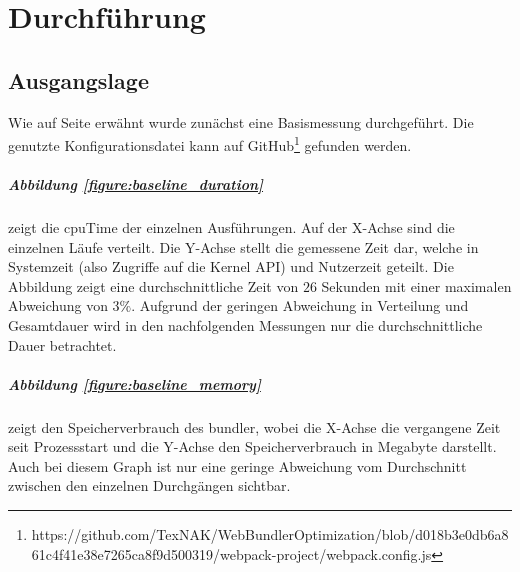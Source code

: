 \documentclass[11pt]{report}
\begin{document}
	\clearpage

	\chapter{Durchführung}
		\section{Ausgangslage}
			Wie auf Seite \pageref{baseline-build} erwähnt wurde zunächst eine Basismessung durchgeführt. Die genutzte Konfigurationsdatei kann auf GitHub\footnote{https://github.com/TexNAK/WebBundlerOptimization/blob/d018b3e0db6a861c4f41e38e7265ca8f9d500319/webpack-project/webpack.config.js} gefunden werden.
			\paragraph{Abbildung \ref{figure:baseline_duration}} zeigt die \Gls{cpuTime} der einzelnen Ausführungen. Auf der X-Achse sind die einzelnen Läufe verteilt. Die Y-Achse stellt die gemessene Zeit dar, welche in Systemzeit (also Zugriffe auf die Kernel API) und Nutzerzeit geteilt. Die Abbildung zeigt eine durchschnittliche Zeit von $26$ Sekunden mit einer maximalen Abweichung von $3\%$. Aufgrund der geringen Abweichung in Verteilung und Gesamtdauer wird in den nachfolgenden Messungen nur die durchschnittliche Dauer betrachtet.
			\paragraph{Abbildung \ref{figure:baseline_memory}} zeigt den Speicherverbrauch des \Gls{bundler}, wobei die X-Achse die vergangene Zeit seit Prozessstart und die Y-Achse den Speicherverbrauch in Megabyte darstellt. Auch bei diesem Graph ist nur eine geringe Abweichung vom Durchschnitt zwischen den einzelnen Durchgängen sichtbar.
\end{document}

